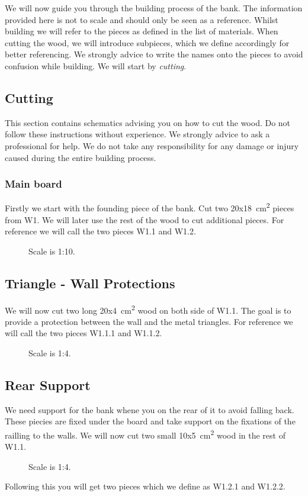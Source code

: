 \documentclass{subfiles}
\begin{document}
    We will now guide you through the building process of the bank. The information provided here is not to scale and should only be seen as a reference. Whilst building we will refer to the pieces as defined in the list of materials. When cutting the wood, we will introduce subpieces, which we define accordingly for better referencing. We strongly advice to write the names onto the pieces to avoid confusion while building. We will start by \emph{cutting}.

    \subsection{Cutting}
        This section contains schematics advising you on how to cut the wood. Do not follow these instructions without experience. We strongly advice to ask a professional for help. We do not take any responsibility for any damage or injury caused during the entire building process.

    \subsubsection*{Main board}
    Firstly we start with the founding piece of the bank. Cut two 20x18\SI{}{\square\centi\meter} pieces from W1.
    We will later use the rest of the wood to cut additional pieces. For reference we will call the two pieces W1.1 and W1.2.
    \begin{figure}[H]
        \centering
        
        \caption{Scale is 1:10.}
    \end{figure}


    \subsection*{Triangle - Wall Protections}
    We will now cut two long 20x4\SI{}{\square\centi\meter} wood on both side of W1.1. The goal is to 
    provide a protection between the wall and the metal triangles. For reference we will call the two pieces W1.1.1 and W1.1.2.
    \begin{figure}[H]
        \centering
        
        \caption{Scale is 1:4.}
    \end{figure}

    \subsection*{Rear Support}
    We need support for the bank whene you on the rear of it to avoid falling back. 
    These piecies are fixed under the board and take support on the fixations of the railling to the walls. 
    We will now cut two small 10x5\SI{}{\square\centi\meter} wood in the rest of W1.1.
    \begin{figure}[H]
        \centering
        
        \caption{Scale is 1:4.}
    \end{figure}
    Following this you will get two pieces which we define as W1.2.1 and W1.2.2.
\end{document}
